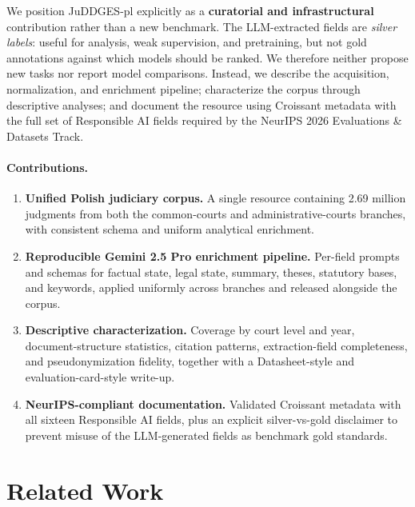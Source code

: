 \documentclass{article}
\begin{document}
We position JuDDGES-pl explicitly as a \textbf{curatorial and infrastructural} contribution rather than a new benchmark. The LLM-extracted fields are \emph{silver labels}: useful for analysis, weak supervision, and pretraining, but not gold annotations against which models should be ranked. We therefore neither propose new tasks nor report model comparisons. Instead, we describe the acquisition, normalization, and enrichment pipeline; characterize the corpus through descriptive analyses; and document the resource using Croissant metadata with the full set of Responsible AI fields required by the NeurIPS 2026 Evaluations \& Datasets Track.

\paragraph{Contributions.}
\begin{enumerate}
    \item \textbf{Unified Polish judiciary corpus.} A single resource containing 2.69 million judgments from both the common-courts and administrative-courts branches, with consistent schema and uniform analytical enrichment.
    \item \textbf{Reproducible Gemini 2.5 Pro enrichment pipeline.} Per-field prompts and schemas for factual state, legal state, summary, theses, statutory bases, and keywords, applied uniformly across branches and released alongside the corpus.
    \item \textbf{Descriptive characterization.} Coverage by court level and year, document-structure statistics, citation patterns, extraction-field completeness, and pseudonymization fidelity, together with a Datasheet-style and evaluation-card-style write-up.
    \item \textbf{NeurIPS-compliant documentation.} Validated Croissant metadata with all sixteen Responsible AI fields, plus an explicit silver-vs-gold disclaimer to prevent misuse of the LLM-generated fields as benchmark gold standards.
\end{enumerate}

\section{Related Work}
\label{sec:related-work}
\end{document}
